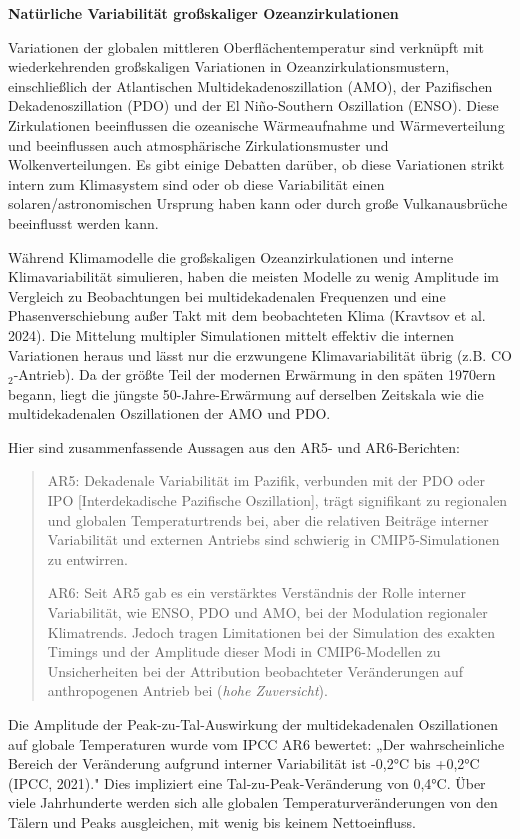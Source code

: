 \documentclass[12pt,paper=a4,DIV=12,parskip=never,chapterprefix=false,headings=standardclasses]{scrreprt}
\begin{document}
\textbf{Natürliche Variabilität großskaliger Ozeanzirkulationen}

Variationen der globalen mittleren Oberflächentemperatur sind verknüpft mit wiederkehrenden großskaligen Variationen in Ozeanzirkulationsmustern, einschließlich der Atlantischen Multidekadenoszillation (AMO), der Pazifischen Dekadenoszillation (PDO) und der El Niño-Southern Oszillation (ENSO). Diese Zirkulationen beeinflussen die ozeanische Wärmeaufnahme und Wärmeverteilung und beeinflussen auch atmosphärische Zirkulationsmuster und Wolkenverteilungen. Es gibt einige Debatten darüber, ob diese Variationen strikt intern zum Klimasystem sind oder ob diese Variabilität einen solaren/astronomischen Ursprung haben kann oder durch große Vulkanausbrüche beeinflusst werden kann.

Während Klimamodelle die großskaligen Ozeanzirkulationen und interne Klimavariabilität simulieren, haben die meisten Modelle zu wenig Amplitude im Vergleich zu Beobachtungen bei multidekadenalen Frequenzen und eine Phasenverschiebung außer Takt mit dem beobachteten Klima (Kravtsov et al. 2024). Die Mittelung multipler Simulationen mittelt effektiv die internen Variationen heraus und lässt nur die erzwungene Klimavariabilität übrig (z.B. CO$_2$-Antrieb). Da der größte Teil der modernen Erwärmung in den späten 1970ern begann, liegt die jüngste 50-Jahre-Erwärmung auf derselben Zeitskala wie die multidekadenalen Oszillationen der AMO und PDO.

Hier sind zusammenfassende Aussagen aus den AR5- und AR6-Berichten:

\begin{quote}
AR5: Dekadenale Variabilität im Pazifik, verbunden mit der PDO oder IPO [Interdekadische Pazifische Oszillation], trägt signifikant zu regionalen und globalen Temperaturtrends bei, aber die relativen Beiträge interner Variabilität und externen Antriebs sind schwierig in CMIP5-Simulationen zu entwirren.

AR6: Seit AR5 gab es ein verstärktes Verständnis der Rolle interner Variabilität, wie ENSO, PDO und AMO, bei der Modulation regionaler Klimatrends. Jedoch tragen Limitationen bei der Simulation des exakten Timings und der Amplitude dieser Modi in CMIP6-Modellen zu Unsicherheiten bei der Attribution beobachteter Veränderungen auf anthropogenen Antrieb bei (\emph{hohe Zuversicht}).
\end{quote}

Die Amplitude der Peak-zu-Tal-Auswirkung der multidekadenalen Oszillationen auf globale Temperaturen wurde vom IPCC AR6 bewertet: „Der wahrscheinliche Bereich der Veränderung aufgrund interner Variabilität ist -0,2°C bis +0,2°C (IPCC, 2021)." Dies impliziert eine Tal-zu-Peak-Veränderung von 0,4°C. Über viele Jahrhunderte werden sich alle globalen Temperaturveränderungen von den Tälern und Peaks ausgleichen, mit wenig bis keinem Nettoeinfluss.
\end{document}
